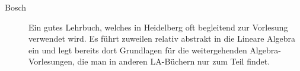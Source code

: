 \begin{description}





\item[Bosch]{
Ein gutes Lehrbuch, welches in Heidelberg oft begleitend zur Vorlesung
verwendet wird. Es führt zuweilen relativ abstrakt in die Lineare
Algebra ein und legt bereits dort Grundlagen für die weitergehenden
Algebra-Vorlesungen, die man in anderen LA-Büchern nur zum Teil findet.
}

\end{description}

